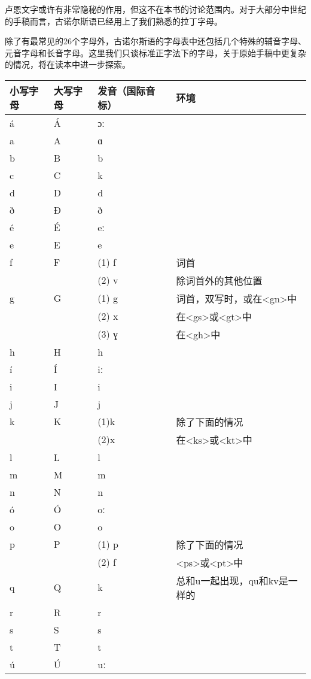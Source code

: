 卢恩文字或许有非常隐秘的作用，但这不在本书的讨论范围内。对于大部分中世纪的手稿而言，古诺尔斯语已经用上了我们熟悉的拉丁字母。

除了有最常见的26个字母外，古诺尔斯语的字母表中还包括几个特殊的辅音字母、元音字母和长音字母。这里我们只谈标准正字法下的字母，关于原始手稿中更复杂的情况，将在读本中进一步探索。

\begin{longtable}{llll}
\toprule
小写字母 & 大写字母 & 发音（国际音标） & 环境 \\
\midrule
\endhead
\bottomrule
\endfoot
á & Á & ɔː & \\
a & A & ɑ & \\
b & B & b & \\
c & C & k & \\
d & D & d & \\
ð & Ð & ð & \\
é & É & eː & \\
e & E & e & \\
f & F & (1) f & 词首 \\
& & (2) v & 除词首外的其他位置 \\
g & G & (1) g & 词首，双写时，或在\textless gn\textgreater 中 \\
& & (2) x & 在\textless gs\textgreater 或\textless gt\textgreater 中 \\
& & (3) ɣ & 在\textless gh\textgreater 中 \\
h & H & h & \\
í & Í & iː & \\
i & I & i & \\
j & J & j & \\
k & K & (1)k & 除了下面的情况 \\
& & (2)x & 在\textless ks\textgreater 或\textless kt\textgreater 中 \\
l & L & l & \\
m & M & m & \\
n & N & n & \\
ó & Ó & oː & \\
o & O & o & \\
p & P & (1) p & 除了下面的情况 \\
& & (2) f & \textless ps\textgreater 或\textless pt\textgreater 中 \\
q & Q & k & 总和u一起出现，qu和kv是一样的 \\
r & R & r & \\
s & S & s & \\
t & T & t & \\
ú & Ú & uː & \\

\end{longtable}
